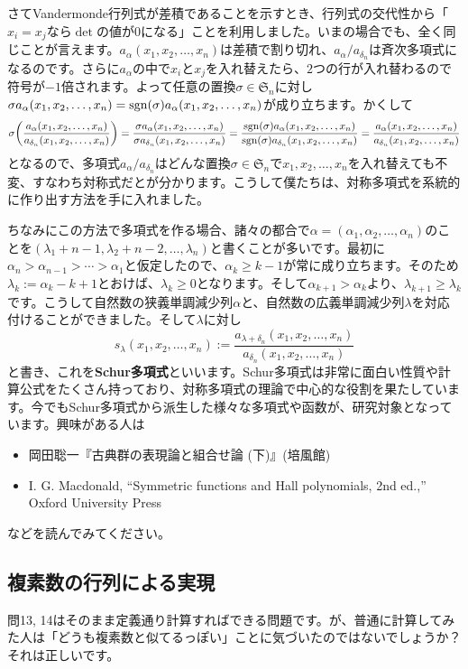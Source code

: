 さてVandermonde行列式が差積であることを示すとき、行列式の交代性から「$x_i = x_j$なら$\det$の値が$0$になる」ことを利用しました。いまの場合でも、全く同じことが言えます。$a_{\alpha}(x_1, x_2, \ldots, x_n)$は差積で割り切れ、$a_{\alpha} / a_{\delta_n}$は斉次多項式になるのです。さらに$a_{\alpha}$の中で$x_i$と$x_j$を入れ替えたら、$2$つの行が入れ替わるので符号が$-1$倍されます。よって任意の置換$\sigma \in \mathfrak{S}_n$に対し$\sigma a_{\alpha}(x_1, x_2, \ldots, x_n) = \operatorname{sgn}(\sigma) a_{\alpha}(x_1, x_2, \ldots, x_n)$が成り立ちます。かくして
\[
\sigma \biggl(\frac{a_{\alpha}(x_1, x_2, \ldots, x_n)}{a_{\delta_n}(x_1, x_2, \ldots, x_n)}\biggr)
= \frac{\sigma a_{\alpha}(x_1, x_2, \ldots, x_n)}{\sigma a_{\delta_n}(x_1, x_2, \ldots, x_n)}
= \frac{\operatorname{sgn}(\sigma) a_{\alpha}(x_1, x_2, \ldots, x_n)}{\operatorname{sgn}(\sigma) a_{\delta_n}(x_1, x_2, \ldots, x_n)}
= \frac{a_{\alpha}(x_1, x_2, \ldots, x_n)}{a_{\delta_n}(x_1, x_2, \ldots, x_n)}
\]
となるので、多項式$a_{\alpha} / a_{\delta_n}$はどんな置換$\sigma \in \mathfrak{S}_n$で$x_1, x_2, \ldots, x_n$を入れ替えても不変、すなわち対称式だとが分かります。こうして僕たちは、対称多項式を系統的に作り出す方法を手に入れました。

ちなみにこの方法で多項式を作る場合、諸々の都合で$\alpha = (\alpha_1, \alpha_2, \ldots, \alpha_n)$のことを$(\lambda_1 + n - 1, \lambda_2 + n -2, \ldots, \lambda_n)$と書くことが多いです。最初に$\alpha_n > \alpha_{n - 1} > \cdots > \alpha_1$と仮定したので、$\alpha_k \geq k - 1$が常に成り立ちます。そのため$\lambda_k := \alpha_k - k + 1$とおけば、$\lambda_k \geq 0$となります。そして$\alpha_{k + 1} > \alpha_k$より、$\lambda_{k + 1} \geq \lambda_k$です。こうして自然数の狭義単調減少列$\alpha$と、自然数の広義単調減少列$\lambda$を対応付けることができました。そして$\lambda$に対し
\[
s_{\lambda}(x_1, x_2, \ldots, x_n)
:= \frac{a_{\lambda + \delta_n}(x_1, x_2, \ldots, x_n)}{a_{\delta_n}(x_1, x_2 ,\ldots, x_n)}
\]
と書き、これを\textbf{Schur多項式}といいます。Schur多項式は非常に面白い性質や計算公式をたくさん持っており、対称多項式の理論で中心的な役割を果たしています。今でもSchur多項式から派生した様々な多項式や函数が、研究対象となっています。興味がある人は
\begin{itemize}
\item 岡田聡一『古典群の表現論と組合せ論 (下)』(培風館)
\item I. G. Macdonald, ``Symmetric functions and Hall polynomials, 2nd ed.,'' Oxford University Press
\end{itemize}
などを読んでみてください。

\subsection{複素数の行列による実現}
問13, 14はそのまま定義通り計算すればできる問題です。が、普通に計算してみた人は「どうも複素数と似てるっぽい」ことに気づいたのではないでしょうか？それは正しいです。

